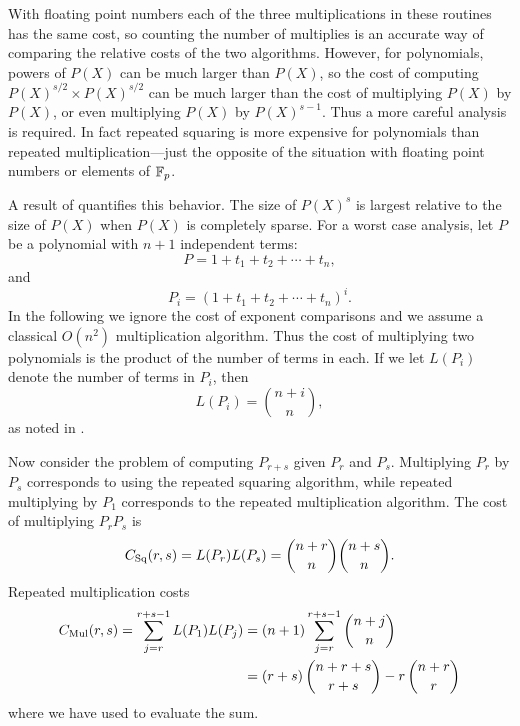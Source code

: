 \noindent
With floating point numbers each of the three multiplications in these
routines has the same cost, so counting the number of multiplies is an
accurate way of comparing the relative costs of the two algorithms.
However, for polynomials, powers of $P(X)$ can be much larger than
$P(X)$, so the cost of computing $P(X)^{s/2} \times P(X)^{s/2}$ can be
much larger than the cost of multiplying $P(X)$ by $P(X)$, or even
multiplying $P(X)$ by $P(X)^{s-1}$.  Thus a more careful analysis is
required.  In fact repeated squaring is more expensive for polynomials
than repeated multiplication---just the opposite of the situation with
floating point numbers or elements of $\mathbb{F}_p$.

A result of {\Gentleman} \cite{Gentleman1972-ti} quantifies this
behavior.  The size of $P(X)^s$ is largest relative to the size of
$P(X)$ when $P(X)$ is completely sparse.  For a worst case analysis,
let $P$ be a polynomial with $n+1$ independent terms:
\[
P = 1 + t_1 + t_2 + \cdots + t_n,
\]
and
\[
P_i = (1 + t_1 + t_2 + \cdots + t_n)^i.
\]
In the following we ignore the cost of exponent comparisons and we assume a
classical $O(n^{2})$ multiplication algorithm.  Thus the cost of
multiplying two polynomials is the product of the number of terms in each.
If we let $L(P_i)$ denote the number of terms in $P_i$, then
\[
L(P_i) = \binom{n + i}{n},
\]
as noted in .

\newcommand{\Csq}{C_{\rm Sq}}
\newcommand{\Cmul}{C_{\rm Mul}}
Now consider the problem of computing $P_{r+s}$ given $P_r$ and $P_s$.
Multiplying $P_r$ by $P_s$ corresponds to using the repeated squaring
algorithm, while repeated multiplying by $P_1$ corresponds to the repeated
multiplication algorithm.  The cost of multiplying $P_r P_s$ is
\[
\Csq(r, s) = L(P_r) L(P_s) = \binom{n + r}{n} \binom{n + s}{n}.
\]
Repeated multiplication costs
\[
\begin{aligned}
  \Cmul(r, s) = 
  \sum_{j=r}^{r+s-1} L(P_1) L(P_j) &=
    (n+1) \sum_{j=r}^{r+s-1} \binom{n + j}{n}\\
     &= (r + s)\, \binom{n + r + s}{r+s} - r\, \binom{n + r}{r}
\end{aligned}
\]
where we have used  to evaluate the sum.


